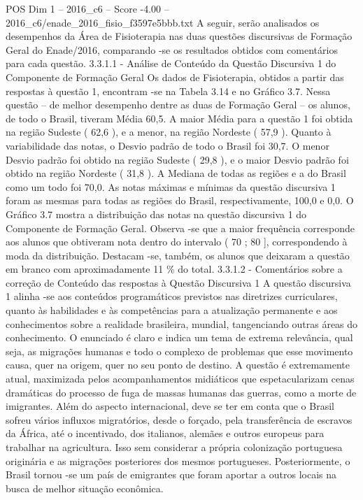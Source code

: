 \begin{textsample}{POS Dim 1 – 2016\_c6 – Score -4.00 – 2016\_c6/enade\_2016\_fisio\_f3597e5bbb.txt}
A seguir, serão analisados os desempenhos da Área de Fisioterapia nas duas questões discursivas de Formação Geral do Enade/2016, comparando -se os resultados obtidos com comentários para cada questão. 3.3.1.1 - Análise de Conteúdo da Questão Discursiva 1 do Componente de Formação Geral Os dados de Fisioterapia, obtidos a partir das respostas à questão 1, encontram -se na Tabela 3.14 e no Gráfico 3.7.
Nessa questão – de melhor desempenho dentre as duas de Formação Geral – os alunos, de todo o Brasil, tiveram Média 60,5.
A maior Média para a questão 1 foi obtida na região Sudeste ( 62,6 ), e a menor, na região Nordeste ( 57,9 ).
Quanto à variabilidade das notas, o Desvio padrão de todo o Brasil foi 30,7.
O menor Desvio padrão foi obtido na região Sudeste ( 29,8 ), e o maior Desvio padrão foi obtido na região Nordeste ( 31,8 ).
A Mediana de todas as regiões e a do Brasil como um todo foi 70,0.
As notas máximas e mínimas da questão discursiva 1 foram as mesmas para todas as regiões do Brasil, respectivamente, 100,0 e 0,0.
O Gráfico 3.7 mostra a distribuição das notas na questão discursiva 1 do Componente de Formação Geral.
Observa -se que a maior frequência corresponde aos alunos que obtiveram nota dentro do intervalo ( 70 ; 80 ], correspondendo à moda da distribuição.
Destacam -se, também, os alunos que deixaram a questão em branco com aproximadamente 11 \% do total. 3.3.1.2 - Comentários sobre a correção de Conteúdo das respostas à Questão Discursiva 1 A questão discursiva 1 alinha -se aos conteúdos programáticos previstos nas diretrizes curriculares, quanto às habilidades e às competências para a atualização permanente e aos conhecimentos sobre a realidade brasileira, mundial, tangenciando outras áreas do conhecimento.
O enunciado é claro e indica um tema de extrema relevância, qual seja, as migrações humanas e todo o complexo de problemas que esse movimento causa, quer na origem, quer no seu ponto de destino.
A questão é extremamente atual, maximizada pelos acompanhamentos midiáticos que espetacularizam cenas dramáticas do processo de fuga de massas humanas das guerras, como a morte de imigrantes.
Além do aspecto internacional, deve se ter em conta que o Brasil sofreu vários influxos migratórios, desde o forçado, pela transferência de escravos da África, até o incentivado, dos italianos, alemães e outros europeus para trabalhar na agricultura.
Isso sem considerar a própria colonização portuguesa originária e as migrações posteriores dos mesmos portugueses.
Posteriormente, o Brasil tornou -se um país de emigrantes que foram aportar a outros locais na busca de melhor situação econômica.

\end{textsample}
